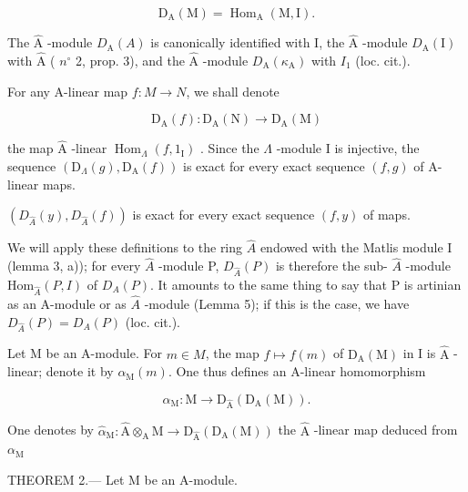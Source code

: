 \[
\mathrm{D} _ {\mathrm{A}} (\mathrm{M}) = \operatorname{Hom} _ {\mathrm{A}} (\mathrm{M}, \mathrm{I}).
\]

The \(\widehat{\mathrm{A}}\) -module \(D_{\mathrm{A}}(A)\) is canonically identified with I, the \(\widehat{\mathrm{A}}\) -module \(D_{\mathrm{A}}(\mathrm{I})\) with \(\widehat{\mathrm{A}}\) ( \(n^{\circ}\) 2, prop. 3), and the \(\widehat{\mathrm{A}}\) -module \(D_{\mathrm{A}}(\kappa_{\mathrm{A}})\) with \(I_{1}\) (loc. cit.).

For any A-linear map \(f: M \rightarrow N\), we shall denote

\[
\mathrm{D} _ {\mathrm{A}} (f): \mathrm{D} _ {\mathrm{A}} (\mathrm{N}) \rightarrow \mathrm{D} _ {\mathrm{A}} (\mathrm{M})
\]

the map \(\widehat{\mathrm{A}}\) -linear \(\operatorname{Hom}_{\Lambda}(f,1_{\mathrm{I}})\) . Since the \(\Lambda\) -module I is injective, the sequence \((\mathrm{D}_{\Lambda}(g),\mathrm{D}_{\mathrm{A}}(f))\) is exact for every exact sequence \((f,g)\) of A-linear maps.

\((D_{\hat{A}}(y), D_{\hat{A}}(f))\) is exact for every exact sequence \((f, y)\) of maps.

We will apply these definitions to the ring \(\hat{A}\) endowed with the Matlis module I (lemma 3, a)); for every \(\hat{A}\) -module P, \(D_{\hat{A}}(P)\) is therefore the sub- \(\hat{A}\) -module \(\text{Hom}_{\hat{A}}(P, I)\) of \(D_{A}(P)\). It amounts to the same thing to say that P is artinian as an A-module or as \(\hat{A}\) -module (Lemma 5); if this is the case, we have \(D_{\hat{A}}(P) = D_{A}(P)\) (loc. cit.).

Let M be an A-module. For \(m \in M\), the map \(f \mapsto f(m)\) of \(\mathrm{D}_{\mathrm{A}}(\mathrm{M})\) in I is \(\widehat{\mathrm{A}}\) -linear; denote it by \(\alpha_{\mathrm{M}}(m)\). One thus defines an A-linear homomorphism

\[
\alpha_ {\mathrm{M}}: \mathrm{M} \longrightarrow \mathrm{D} _ {\widehat {\mathrm{A}}} (\mathrm{D} _ {\mathrm{A}} (\mathrm{M})) .
\]

One denotes by \(\widehat{\alpha}_{\mathrm{M}}:\widehat{\mathrm{A}}\otimes_{\mathrm{A}}\mathrm{M}\longrightarrow \mathrm{D}_{\widehat{\mathrm{A}}}(\mathrm{D}_{\mathrm{A}}(\mathrm{M}))\) the \(\widehat{\mathrm{A}}\) -linear map deduced from \(\alpha_{\mathrm{M}}\)

THEOREM 2.--- Let M be an A-module.

